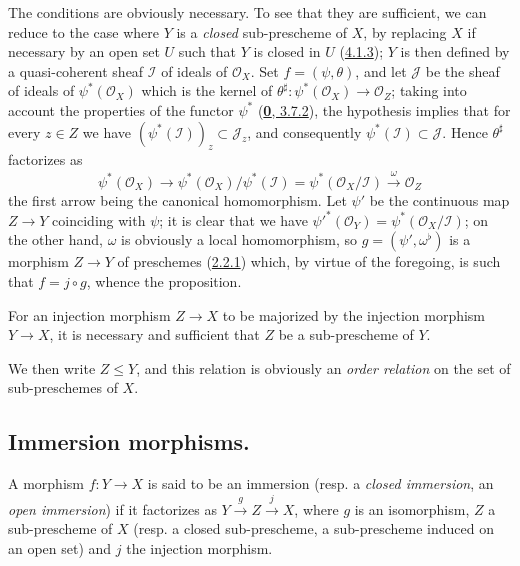 The conditions are obviously necessary. To see that they are
sufficient, we can reduce to the case where $Y$ is a \emph{closed}
sub-prescheme of $X$, by replacing $X$ if necessary by an open set $U$ such that
$Y$ is closed in $U$ (\hyperref[I.4.1.3]{4.1.3}); $Y$ is then defined
by a quasi-coherent sheaf $\mathscr{I}$ of ideals of $\mathscr{O}_X$.
Set $f=(\psi,\theta)$, and let $\mathscr{J}$ be the sheaf of ideals of
$\psi^*(\mathscr{O}_X)$ which is the kernel of
$\theta^\sharp:\psi^*(\mathscr{O}_X)\to\mathscr{O}_Z$; taking into account the
properties of the functor $\psi^*$ (\hyperref[0.3.7.2]{\textbf{0}, 3.7.2}),
the hypothesis implies that for every $z\in Z$ we have
$(\psi^*(\mathscr{I}))_z\subset\mathscr{J}_z$, and consequently
$\psi^*(\mathscr{I})\subset\mathscr{J}$. Hence $\theta^\sharp$
factorizes as
\[
  \psi^*(\mathscr{O}_X)\longrightarrow
  \psi^*(\mathscr{O}_X)/\psi^*(\mathscr{I})
  =\psi^*(\mathscr{O}_X/\mathscr{I})
  \xrightarrow{\omega}\mathscr{O}_Z
\]
the first arrow being the canonical homomorphism. Let $\psi'$ be the continuous
map $Z\to Y$ coinciding with $\psi$; it is clear that we have
${\psi'}^*(\mathscr{O}_Y)=\psi^*(\mathscr{O}_X/\mathscr{I})$; on the other
hand, $\omega$ is obviously a local homomorphism, so
$g=(\psi',\omega^\flat)$ is a morphism $Z\to Y$
of preschemes (\hyperref[I.2.2.1]{2.2.1}) which, by virtue of the
foregoing, is such that $f=j\circ g$, whence the proposition.

\begin{corollary}[4.1.10]
\label{I.4.1.10}
For an injection morphism $Z\to X$ to be majorized by the injection
morphism $Y\to X$, it is necessary and sufficient that $Z$ be a sub-prescheme
of $Y$.
\end{corollary}

We then write $Z\leq Y$, and this relation is obviously an
\emph{order relation} on the set of sub-preschemes of $X$.

\subsection{Immersion morphisms.}
\label{subsection:I.4.2}

\begin{definition}[4.2.1]
\label{I.4.2.1}
A morphism $f:Y\to X$ is said to be an immersion (resp. a
\emph{closed immersion}, an \emph{open immersion}) if it factorizes as
$Y\xrightarrow{g}Z\xrightarrow{j}X$, where $g$ is an isomorphism, $Z$ a
sub-prescheme of $X$ (resp. a closed sub-prescheme, a sub-prescheme induced
on an open set) and $j$ the injection morphism.
\end{definition}

